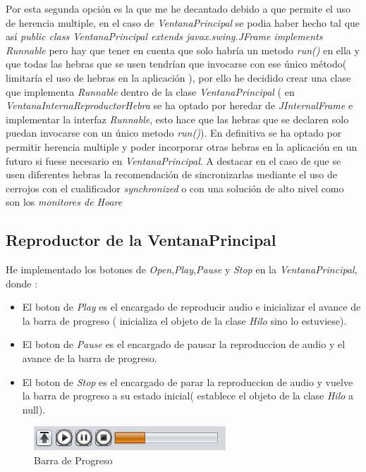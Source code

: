 Por esta segunda opción es la que me he decantado debido a que permite el uso de herencia multiple, en el caso de \emph{VentanaPrincipal} se podia haber hecho tal que así \emph{public class VentanaPrincipal extends javax.swing.JFrame implements Runnable} pero hay que tener en cuenta que solo habría un metodo \emph{run()} en ella y que todas las hebras que se usen tendrían que invocarse con ese único método( limitaría el uso de hebras en la aplicación ), por ello he decidido crear una clase que implementa \emph{Runnable} dentro de la clase \emph{VentanaPrincipal}  ( en \emph{VentanaInternaReproductorHebra} se ha optado por heredar de \emph{JInternalFrame} e implementar la interfaz \emph{Runnable}, esto hace que las hebras que se declaren solo puedan invocarse con un único metodo \emph{run()}). En definitiva se ha optado por permitir herencia multiple y poder incorporar otras hebras en la aplicación en un futuro si fuese necesario en \emph{VentanaPrincipal}.
A destacar en el caso de que se usen diferentes hebras la recomendación de sincronizarlas mediante el uso de cerrojos con el cualificador \emph{synchronized} o con una solución de alto nivel como son los \emph{monitores de Hoare}

\subsection{Reproductor de la VentanaPrincipal}
He implementado los botones de \emph{Open},\emph{Play},\emph{Pause} y \emph{Stop} en la \emph{VentanaPrincipal}, donde :
\begin{itemize}
\item El boton de \emph{Play} es el encargado de reproducir audio e inicializar el avance de la barra de progreso ( inicializa el objeto de la clase \emph{Hilo} sino lo estuviese).
\item El boton de \emph{Pause} es el encargado de pausar la reproduccion de audio y el avance de la barra de progreso.
\item El boton de \emph{Stop} es el encargado de parar la reproduccion de audio y vuelve la barra de progreso a su estado inicial( establece el objeto de la clase \emph{Hilo} a null).
\end{itemize}

\begin{figure}[H]
  \centering
    \includegraphics[scale=0.75]{images/barraprogreso2}
  \caption{Barra de Progreso}
  \label{Barra de Progreso}
\end{figure}


